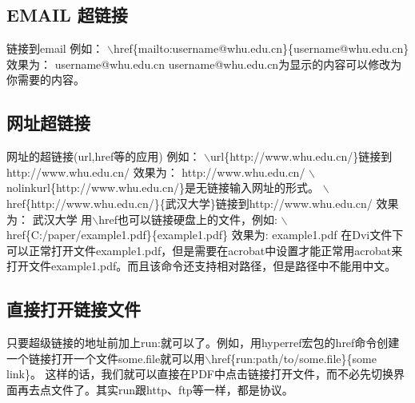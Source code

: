 \subsection{EMAIL 超链接}

链接到email \newline 例如： \newline $\backslash
$href{\{}mailto:username@whu.edu.cn{\}}{\{}username@whu.edu.cn{\}}
\newline \textcolor[rgb]{0.50,0.00,0.50}{效果为：} \newline
username@whu.edu.cn \newline
username@whu.edu.cn为显示的内容可以修改为你需要的内容。 \newline

\subsection{网址超链接}
网址的超链接(url,href等的应用) \newline 例如： \newline $\backslash
$url{\{}http://www.whu.edu.cn/{\}}链接到http://www.whu.edu.cn/
\newline
效果为： \newline http://www.whu.edu.cn/ \newline $\backslash
$nolinkurl{\{}http://www.whu.edu.cn/{\}}是无链接输入网址的形式。
\newline
$\backslash
$href{\{}http://www.whu.edu.cn/{\}}{\{}武汉大学{\}}链接到http://www.whu.edu.cn/
\newline
\textcolor[rgb]{0.50,0.00,0.50}{效果为：} \newline 武汉大学 \newline
用$\backslash $href也可以链接硬盘上的文件，例如: \newline
$\backslash $href{\{}C:/paper/example1.pdf{\}}{\{}example1.pdf{\}}
\newline 效果为: \newline example1.pdf \newline
在Dvi文件下可以正常打开文件example1.pdf，但是需要在acrobat中设置才能正常用acrobat来打开文件example1.pdf。而且该命令还支持相对路径，但是路径中不能用中文。
\newline
\subsection{直接打开链接文件}
只要超级链接的地址前加上run:就可以了。例如，用hyperref宏包的href命令创建一个链接打开一个文件some.file就可以用$\backslash$href\{run:path/to/some.file\}\{some
link\}。
这样的话，我们就可以直接在PDF中点击链接打开文件，而不必先切换界面再去点文件了。其实run跟http、ftp等一样，都是协议。

